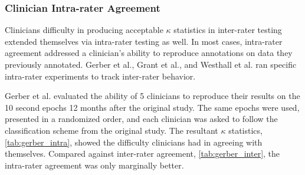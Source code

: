 \subsubsection{Clinician Intra-rater Agreement}

Clinicians difficulty in producing acceptable $\kappa$ statistics in inter-rater testing extended themselves via intra-rater testing as well. In most cases, intra-rater agreement addressed a clinician's ability to reproduce annotations on data they previously annotated. Gerber et al., Grant et al., and Westhall et al. ran specific intra-rater experiments to track inter-rater behavior.

Gerber et al. evaluated the ability of 5 clinicians to reproduce their results on the 10 second epochs 12 months after the original study. The same epochs were used, presented in a randomized order, and each clinician was asked to follow the classification scheme from the original study. The resultant $\kappa$ statistics, \cref{tab:gerber_intra}, showed the difficulty clinicians had in agreeing with themselves. Compared against inter-rater agreement, \cref{tab:gerber_inter}, the intra-rater agreement was only marginally better.

\begin{table}[ht]
\centering
\caption[Intra-rater agreement after 12 months]{The 5 clinicians in the original 10s epoch evaluations, re-evaluate the same set of data 12 months later. These results represent how well each clinician agrees with their original classifications.}
\label{tab:gerber_intra}
\end{table}

